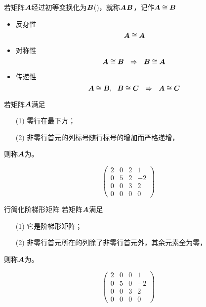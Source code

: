 \begin{frame}
\begin{dingyi}[矩阵的相抵]
  若矩阵$\boldsymbol{A}$经过初等变换化为$\boldsymbol{B}$()，就称$\boldsymbol{A}$$\boldsymbol{B}$，记作$\boldsymbol{A}\cong\boldsymbol{B}$
\end{dingyi}

\begin{xingzhi}[相抵关系的性质]
  \begin{itemize}
  \item 反身性
    $$
    \boldsymbol{A}\cong\boldsymbol{A}
    $$
  \item 对称性
    $$
    \boldsymbol{A}\cong\boldsymbol{B} ~~\Rightarrow~~ \boldsymbol{B}\cong\boldsymbol{A}
    $$
  \item 传递性
    $$
    \boldsymbol{A}\cong\boldsymbol{B},~~\boldsymbol{B}\cong\boldsymbol{C} ~~\Rightarrow~~ \boldsymbol{A}\cong\boldsymbol{C}
    $$
  \end{itemize}
\end{xingzhi}
\end{frame}

\begin{frame}
\begin{dingyi}[阶梯形矩阵]
  若矩阵$\boldsymbol{A}$满足
  \begin{itemize}
  \item[(1)] 零行在最下方；
  \item[(2)] 非零行首元的列标号随行标号的增加而严格递增，
  \end{itemize}
  则称$\boldsymbol{A}$为。
\end{dingyi}

\begin{li*}
  $$
  \left(
    \begin{array}{rrrr}
      2&0&2&1\\
      0&5&2&-2\\
      0&0&3&2\\
      0&0&0&0
    \end{array}
  \right)
  $$
\end{li*}
\end{frame}

\begin{frame}
\begin{dingyi}{行简化阶梯形矩阵}
  若矩阵$\boldsymbol{A}$满足
  \begin{itemize}
  \item[(1)] 它是阶梯形矩阵；
  \item[(2)] 非零行首元所在的列除了非零行首元外，其余元素全为零，
  \end{itemize}
  则称$\boldsymbol{A}$为。
\end{dingyi}

\begin{li*}
  $$
  \left(
    \begin{array}{rrrr}
      2&0&0&1\\
      0&5&0&-2\\
      0&0&3&2\\
      0&0&0&0
    \end{array}
  \right)
  $$
\end{li*}
\end{frame}


